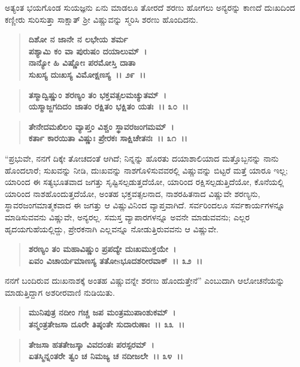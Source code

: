 ಅತ್ಯಂತ ಭಯಗೊಂಡ ಸುಯಜ್ಞನು ಏನು ಮಾಡಲೂ ತೋರದೆ ಶರಣು ಹೋಗಲು ಅನ್ಯರನ್ನು ಕಾಣದೆ ದುಃಖದಿಂದ ಕಣ್ಣೀರು ಸುರಿಸುತ್ತಾ ಸಾಕ್ಷಾತ್ ಶ‍್ರೀ ವಿಷ್ಣುವನ್ನು ಸ್ಮರಿಸಿ ಶರಣು ಹೊಂದಿದನು.

\begin{verse}
\textbf{ದಿಶೋ ನ ಜಾನೇ ನ ಲಭೇಯ ಶರ್ಮ} \\\textbf{ಪಶ್ಯಾಮಿ ಕಂ ವಾ ಪುರುಷಂ ದಯಾಲುಮ್~।}\\\textbf{ನಾನ್ಯೋ ಹಿ ವಿಷ್ಣೋಃ ಪರಮೋಸ್ತಿ ದಾತಾ} \\\textbf{ಸುಖಸ್ಯ ದುಃಖಸ್ಯ ವಿಮೋಕ್ಷಣಸ್ಯ~।। ೨೯~।। }
\end{verse}

\begin{verse}
\textbf{ತಸ್ಮಾದ್ವಿಷ್ಣುಂ ಶರಣ್ಯಂ ತಂ ಭಕ್ತವತ್ಸಲಮಚ್ಯುತಮ್~।}\\\textbf{ಯಸ್ಮಾಜ್ಜಗದಿದಂ ಜಾತಂ ರಕ್ಷಿತಂ ಭಕ್ಷಿತಂ ಯತಃ~।। ೩೦~।।} 
\end{verse}

\begin{verse}
\textbf{ತೇನೇದಮಖಿಲಂ ವ್ಯಾಪ್ತಂ ವಿಶ್ಚಂ ಸ್ಥಾವರಜಂಗಮಮ್~।}\\\textbf{ಕರ್ತಾ ಕಾರಯಿತಾ ವಿಷ್ಣುಃ ಪ್ರೇರಕಃ ಸಾಕ್ಷಿಚೇತನಃ~।। ೩೧~।।}
\end{verse}

“ಪ್ರಭುವೇ, ನನಗೆ ದಿಕ್ಕೇ ತೋಚದಂತೆ ಆಗಿದೆ; ನಿನ್ನನ್ನು ಹೊರತು ದಯಾಶಾಲಿಯಾದ ಮತ್ತೊಬ್ಬನನ್ನು ನಾನು ಹೊಂದಲಾರೆ; ಸುಖವನ್ನು ನೀಡಿ, ದುಃಖವನ್ನು ನಾಶಗೊಳಿಸುವವರಲ್ಲಿ ವಿಷ್ಣುವನ್ನು ಬಿಟ್ಟರೆ ಮತ್ತೆ ಯಾರೂ ಇಲ್ಲ; ಯಾರಿಂದ ಈ ಸತ್ಯಭೂತವಾದ ಜಗತ್ತು ಸೃಷ್ಟಿಸಲ್ಪಡುತ್ತದೆಯೋ, ಯಾರಿಂದ ರಕ್ಷಿಸಲ್ಪಡುತ್ತಿದೆಯೋ, ಕೊನೆಯಲ್ಲಿ ಯಾರಿಂದ ನಾಶಹೊಂದುತ್ತದೆಯೋ, ಅಂತಹ ಭಕ್ತವತ್ಸಲನಾದ, ನಾಶರಹಿತನಾದ ವಿಷ್ಣುವೇ ಶರಣ್ಯನು, ಸ್ಥಾವರಜಂಗಮಾತ್ಮಕವಾದ ಈ ಜಗತ್ತು ಆ ವಿಷ್ಣುವಿನಿಂದ ವ್ಯಾಪ್ತವಾಗಿದೆ. ಸರ್ವರಿಂದಲೂ ಸರ್ವಕಾರ್ಯಗಳನ್ನೂ ಮಾಡಿಸುವವನು ವಿಷ್ಣುವೇ, ಅನ್ಯರಲ್ಲ. ಸಮಸ್ತ ವ್ಯಾಪಾರಗಳನ್ನೂ ಅವನೇ ಮಾಡುವವನು; ಎಲ್ಲರ ಹೃದಯಗುಹೆಯಲ್ಲಿದ್ದು, ಪ್ರೇರಕನಾಗಿ ಎಲ್ಲವನ್ನೂ ನೋಡುತ್ತಿರುವವನು ಆ ವಿಷ್ಣುವೇ.

\begin{verse}
\textbf{ಶರಣ್ಯಂ ತಂ ಮಹಾವಿಷ್ಣುಂ ಪ್ರಪದ್ಯೇ ದುಃಖಮುಕ್ತಯೇ~।}\\\textbf{ಏವಂ ವಿಚಾರ್ಯಮಾಣಸ್ಯ ತತೋsಭೂದಶರೀರವಾಕ್~।। ೩೨~।।}
\end{verse}

ನನಗೆ ಬಂದಿರುವ ದುಃಖನಾಶಕ್ಕೆ ಅಂತಹ ವಿಷ್ಣುವನ್ನೇ ಶರಣು ಹೊಂದುತ್ತೇನೆ'' ಎಂಬುದಾಗಿ ಆಲೋಚನೆಯನ್ನು ಮಾಡುತ್ತಿದ್ದಾಗ ಅಶರೀರವಾಣಿ ನುಡಿಯಿತು.

\begin{verse}
\textbf{ಮುನಿಪುತ್ರ ನದೀಂ ಗಚ್ಚ ಜಪ ಮಂತ್ರಮುಪಾಂಶುಕಮ್~।}\\\textbf{ತನ್ಮಂತ್ರತೇಜಸಾ ದೂರೇ ತಿಷ್ಠಂತೇ ಸುದಾರುಣಾಃ~।। ೩೩~।। }
\end{verse}

\begin{verse}
\textbf{ತೇಜಸಾ ಹತತೇಜಸ್ಕಾ ವಿವದಂತಃ ಪರಸ್ಪರಮ್~।}\\\textbf{ಏತಸ್ಮಿನ್ನಂತರೇ ತ್ವಂ ಚ ನಿಮಜ್ಯ ಚ ನದೀಜಲೇ~।। ೩೪~।।} 
\end{verse}

